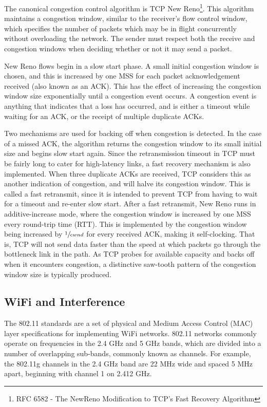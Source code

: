 The canonical congestion control algorithm is TCP New Reno\footnote{RFC 6582 -
The NewReno Modification to TCP's Fast Recovery Algorithm}. This algorithm
maintains a congestion window, similar to the receiver's flow control window,
which specifies the number of packets which may be in flight concurrently
without overloading the network. The sender must respect both the receive and
congestion windows when deciding whether or not it may send a packet.

New Reno flows begin in a slow start phase. A small initial congestion window
is chosen, and this is increased by one MSS for each packet acknowledgement
received (also known as an ACK). This has the effect of increasing the
congestion window size exponentially until a congestion event occurs. A
congestion event is anything that indicates that a loss has occurred, and is
either a timeout while waiting for an ACK, or the receipt of multiple
duplicate ACKs.

Two mechanisms are used for backing off when congestion is detected. In the
case of a missed ACK, the algorithm returns the congestion window to its small
initial size and begins slow start again. Since the retransmission timeout in TCP
must be
fairly long to cater for high-latency links, a fast recovery mechanism is also
implemented. When three duplicate ACKs are received, TCP considers this as another
indication of congestion, and will halve its congestion window. This is called a
fast retransmit, since it is intended to prevent TCP from having to wait for a
timeout and re-enter slow start. After a fast retransmit, New Reno runs in
additive-increase mode, where the congestion window is increased by one MSS
every round-trip time (RTT). This is implemented by the congestion window being
increased by $\sfrac{1}{cwnd}$ for every received ACK, making it self-clocking.
That is, TCP will not send data faster than the speed at which packets go
through the bottleneck link in the path.
As TCP probes for available capacity and backs off
when it encounters congestion, a distinctive saw-tooth pattern of the congestion
window size is typically produced.

\subsection{WiFi and Interference}
\label{sec:bg:wifi}
The 802.11 standards are a set of physical and Medium Access Control (MAC) layer
specifications for
implementing WiFi networks. 802.11 networks commonly operate on frequencies in
the 2.4 GHz and 5 GHz bands, which are divided into a number of overlapping
sub-bands, commonly known as channels. For example, the 802.11g channels in
the 2.4 GHz band are 22 MHz wide and spaced 5 MHz apart, beginning with channel
1 on 2.412
GHz.

